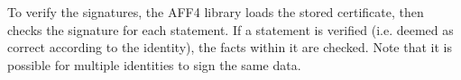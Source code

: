 \documentclass[10pt, conference]{IEEEtran}
\begin{document}
To verify the signatures, the AFF4 library loads the stored
certificate, then checks the signature for each statement. If a
statement is verified (i.e. deemed as correct according to the
identity), the facts within it are checked. Note that it is possible
for multiple identities to sign the same data.







\end{document}
